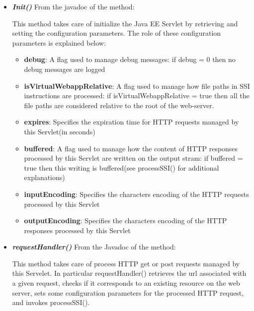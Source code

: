 \documentclass[11pt,titlepage]{article} %
\begin{document}
  \begin{itemize}
    \item \textbf{\textit{Init()}}
      \newline From the javadoc of the method:
      
      This method takes care of initialize the Java EE Servlet by retrieving and setting the configuration
      parameters.\newline
      The role of these configuration parameters is explained below:
      \begin{itemize}
       \item \textbf{debug}:
	A flag used to manage debug messages: if debug = 0 then no debug messages are logged
       \item \textbf{isVirtualWebappRelative}:
	A flag used to manage how file paths in SSI instructions are processed: if isVirtualWebappRelative = true then all the file paths are
	considered relative to the root of the web-server.
       \item \textbf{expires}:
	Specifies the expiration time for HTTP requests managed by this Servlet(in seconds)
       \item \textbf{buffered}:
	A flag used to manage how the content of HTTP responses processed by this Servlet are written on the output stram:
	if buffered = true then this writing is buffered(see processSSI() for additional explanations)
       \item \textbf{inputEncoding}:
	Specifies the characters encoding of the HTTP requests processed by this Servlet
       \item \textbf{outputEncoding}:
	Specifies the characters encoding of the HTTP responses processed by this Servlet
      \end{itemize}



    \item \textbf{\textit{requestHandler()}}
      \newline From the Javadoc of the method:

      

      This method takes care of process HTTP get or post requests managed by this Servelet. In particular
      requestHandler() retrieves the url associated with a given request, checks if it corresponds to an
      existing resource on the web server, sets some configuration parameters for the processed HTTP request, and
      invokes processSSI().\newline


\end{itemize}
\end{document}
